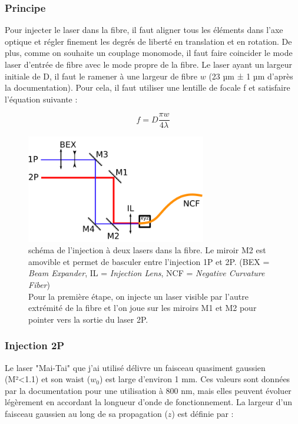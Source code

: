 \subsubsection{Principe}

Pour injecter le laser dans la fibre, il faut aligner tous les éléments dans l'axe optique et régler finement les degrés de liberté en translation et en rotation. De plus, comme on souhaite un couplage monomode, il faut faire coincider le mode laser d'entrée de fibre avec le mode propre de la fibre. Le laser ayant un largeur initiale de D, il faut le ramener à une largeur de fibre $w$ (23 µm ± 1 µm d'après la documentation). Pour cela, il faut utiliser une lentille de focale f et satisfaire l'équation suivante :

$$
f = D\frac{\pi w}{4\lambda}
$$

\begin{figure}
\centering
\includegraphics[width=0.7\textwidth]{./files/injection.svg.png}
\caption{schéma de l'injection à deux lasers dans la fibre. Le miroir M2 est amovible et permet de basculer entre l'injection 1P et 2P. (BEX = \emph{Beam Expander}, IL = \emph{Injection Lens}, NCF = \emph{Negative Curvature Fiber})
\\ Pour la première étape, on injecte un laser visible par l'autre extrémité de la fibre et l'on joue sur les miroirs M1 et M2 pour pointer vers la sortie du laser 2P.
\label{FIGinjection}}
\end{figure}

\subsubsection{Injection 2P}

Le laser "Mai-Tai" que j'ai utilisé délivre un faisceau quasiment gaussien (M²<1.1) et son waist ($w_0$) est large d'environ 1 mm. Ces valeurs sont données par la documentation pour une utilisation à 800 nm, mais elles peuvent évoluer légèrement en accordant la longueur d'onde de fonctionnement. La largeur d'un faisceau gaussien au long de sa propagation ($z$) est définie par :


